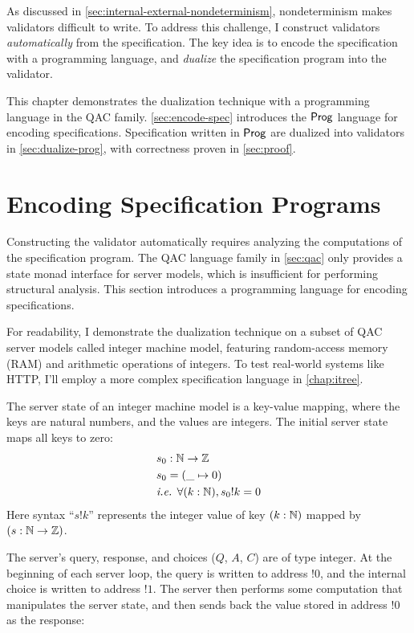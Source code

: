 As discussed in \autoref{sec:internal-external-nondeterminism}, nondeterminism
makes validators difficult to write.  To address this challenge, I construct
validators {\em automatically} from the specification.  The key idea is to
encode the specification with a programming language, and {\em dualize} the
specification program into the validator.

This chapter demonstrates the dualization technique with a programming language
in the QAC family.  \autoref{sec:encode-spec} introduces the $\mathsf{Prog}$ language
for encoding specifications.  Specification written in $\mathsf{Prog}$ are dualized into
validators in \autoref{sec:dualize-prog}, with correctness proven in
\autoref{sec:proof}.

\section{Encoding Specification Programs}
\label{sec:encode-spec}
Constructing the validator automatically requires analyzing the computations of
the specification program.  The QAC language family in \autoref{sec:qac} only
provides a state monad interface for server models, which is insufficient for
performing structural analysis.  This section introduces a programming language
for encoding specifications.

For readability, I demonstrate the dualization technique on a subset of QAC
server models called integer machine model, featuring random-access memory (RAM)
and arithmetic operations of integers.  To test real-world systems like HTTP,
I'll employ a more complex specification language in \autoref{chap:itree}.

\begin{definition}
  The server state of an integer machine model is a key-value mapping, where the
  keys are natural numbers, and the values are integers.  The initial server
  state maps all keys to zero:
  \begin{align*}
    &s_0:\mathbb N\to\mathbb Z\\
    &s_0=(\_\mapsto0)\\
    &\textit{i.e. }\forall (k:\mathbb N), s_0!k=0
  \end{align*}
  Here syntax ``$s!k$'' represents the integer value of key $(k:\mathbb N)$ mapped by
  $(s:\mathbb N\to\mathbb Z)$.

  The server's query, response, and choices ($Q$, $A$, $C$) are of type integer.
  At the beginning of each server loop, the query is written to address $!0$,
  and the internal choice is written to address $!1$.  The server then performs
  some computation that manipulates the server state, and then sends back the
  value stored in address $!0$ as the response:
\end{definition}


